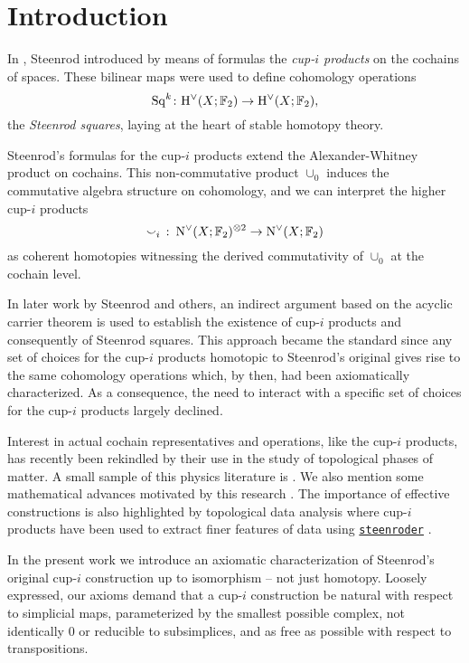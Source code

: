 
\section{Introduction} \label{s:introduction}

In \cite{steenrod1947products}, Steenrod introduced by means of formulas the \textit{\mbox{cup-$i$} products} on the cochains of spaces.
These bilinear maps were used to define cohomology operations
\[
\mathrm{Sq}^k \colon \mathrm{H}^\vee(X; {\mathbb{F}_2}) \to \mathrm{H}^\vee(X; {\mathbb{F}_2}),
\]
the \textit{Steenrod squares}, laying at the heart of stable homotopy theory.

Steenrod's formulas for the \mbox{cup-$i$} products extend the Alexander-Whitney product on cochains.
This non-commutative product $\cup_0$ induces the commutative algebra structure on cohomology, and we can interpret the higher \mbox{cup-$i$} products
\[
\smallsmile_i\ \colon \operatorname{N^{\vee}}(X; {\mathbb{F}_2})^{\otimes 2} \to \operatorname{N^{\vee}}(X; {\mathbb{F}_2})
\]
as coherent homotopies witnessing the derived commutativity of $\cup_0$ at the cochain level.

In later work by Steenrod and others, an indirect argument based on the acyclic carrier theorem is used to establish the existence of \mbox{cup-$i$} products and consequently of Steenrod squares.
This approach became the standard since any set of choices for the \mbox{cup-$i$} products homotopic to Steenrod's original gives rise to the same cohomology operations which, by then, had been axiomatically characterized.
As a consequence, the need to interact with a specific set of choices for the \mbox{cup-$i$} products largely declined.

Interest in actual cochain representatives and operations, like the \mbox{cup-$i$} products, has recently been rekindled by their use in the study of topological phases of matter.
A small sample of this physics literature is \cite{gaiotto2016spin, kapustin2017fermionic, meng2018classification, wang2020construction, barkeshli2021classification, tata2021anomalies, tata2021cubical}.
We also mention some mathematical advances motivated by this research \cite{brumfiel2016pontrjagin, brumfiel2018pontrjagin, medina2020cartan, medina2021adem}.
The importance of effective constructions is also highlighted by topological data analysis where cup-$i$ products have been used to extract finer features of data using \href{https://github.com/Steenroder/steenroder}{\texttt{steenroder}} \cite{medina2021per_st}.

In the present work we introduce an axiomatic characterization of Steenrod's original cup-$i$ construction up to isomorphism -- not just homotopy.
Loosely expressed, our axioms demand that a cup-$i$ construction be natural with respect to simplicial maps, parameterized by the smallest possible complex, not identically $0$ or reducible to subsimplices, and as free as possible with respect to transpositions.

